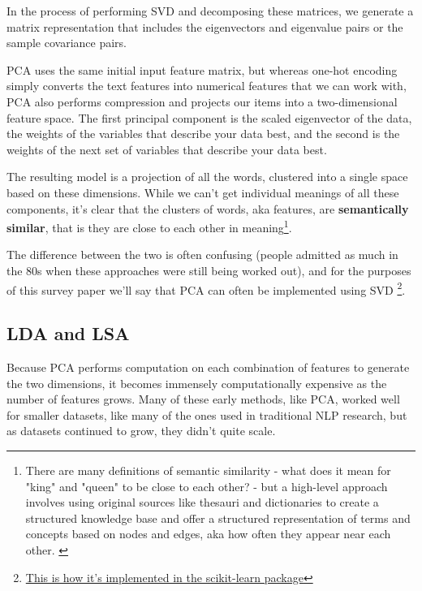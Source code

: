 \documentclass[11pt, table]{diazessay} %
\begin{document}
\begin{sloppypar}
In the process of performing SVD and decomposing these matrices, we generate a matrix representation that includes the eigenvectors and eigenvalue pairs or the sample covariance pairs.

PCA uses the same initial input feature matrix, but whereas one-hot encoding simply converts the text features into numerical features that we can work with, PCA also performs compression and projects our items into a two-dimensional feature space.  The first principal component is the scaled eigenvector of the data, the weights of the variables that describe your data best, and the second is the weights of the next set of variables that describe your data best.

The resulting model is a projection of all the words, clustered into a single space based on these dimensions. While we can't get individual meanings of all these components, it’s clear that the clusters of words, aka features, are \textbf{semantically similar}, that is they are close to each other in meaning\footnote{There are many definitions of semantic similarity - what does it mean for "king" and "queen" to be close to each other? - but a high-level approach involves using original sources like thesauri and dictionaries to create a structured knowledge base and offer a structured representation of terms and concepts based on nodes and edges, aka how often they appear near each other. \cite{chandrasekaran2021evolution}}.
 
The difference between the two is often confusing (people admitted as much in the 80s \cite{gerbrands1981relationships} when these approaches were still being worked out), and for the purposes of this survey paper we'll say that PCA can often be implemented using SVD \footnote{\href{https://scikit-learn.org/stable/modules/generated/sklearn.decomposition.PCA.html}{This is how it's implemented in the scikit-learn package}}.  


\subsection{LDA and LSA}

Because PCA performs computation on each combination of features to generate the two dimensions, it becomes immensely computationally expensive as the number of features grows.  Many of these early methods, like PCA, worked well for smaller datasets, like many of the ones used in traditional NLP research,  but as datasets continued to grow, they didn’t quite scale.  


\end{sloppypar}
\end{document}

